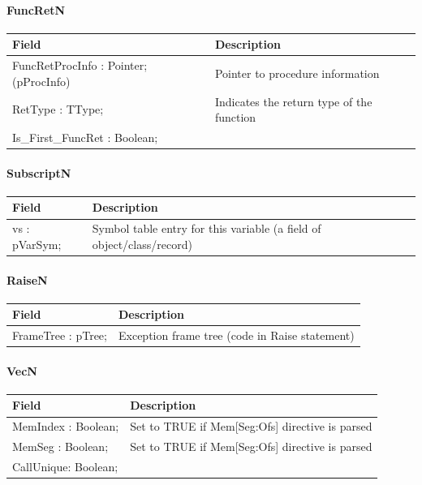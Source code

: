\documentclass [a4paper,12pt]{article}
\begin{document}
\paragraph{FuncRetN}\mbox{}

\begin{longtable}{|l|p{10cm}|}
\hline
Field   & Description \\
\hline
\endhead
\hline
\endfoot
\textsf{FuncRetProcInfo : Pointer; (pProcInfo)}&
    Pointer to procedure information  \\
\textsf{RetType : TType;}& Indicates the return type of the function \\
\textsf{Is{\_}First{\_}FuncRet : Boolean;}&  \\
\hline
\end{longtable}

\paragraph{SubscriptN}\mbox{}

\begin{longtable}{|l|p{10cm}|}
\hline
Field   & Description \\
\hline
\endhead
\hline
\endfoot
\textsf{vs : pVarSym;}&
    Symbol table entry for this variable (a field of
    object/class/record) \\
\hline
\end{longtable}

\paragraph{RaiseN}\mbox{}

\begin{longtable}{|l|p{10cm}|}
\hline
Field   & Description \\
\hline
\endhead
\hline
\endfoot
\textsf{FrameTree : pTree;} & Exception frame tree (code in Raise statement)
\end{longtable}

\paragraph{VecN}\mbox{}

\begin{longtable}{|l|p{10cm}|}
\hline
Field   & Description \\
\hline
\endhead
\hline
\endfoot
\textsf{MemIndex  : Boolean;} & Set to TRUE if Mem[Seg:Ofs] directive is parsed \\
\textsf{MemSeg    : Boolean;} & Set to TRUE if Mem[Seg:Ofs] directive is parsed \\
\textsf{CallUnique: Boolean;} &
\end{longtable}
\end{document}
